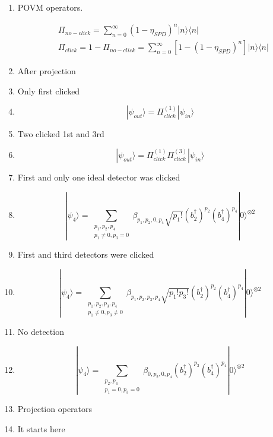 \documentclass[12pt]{article}
\begin{document}
\begin{enumerate}
\item POVM operators.

\begin{align*}
&  \Pi_{no-click} = \sum_{n=0}^{\infty} (1-\eta_{SPD})^n  |n\rangle  \langle n|   \\
&  \Pi_{click} = 1 - \Pi_{no-click} = \sum_{n=0}^{\infty}[1 - (1-\eta_{SPD})^n]  |n\rangle  \langle n|
\end{align*}




\item After projection

\item Only first clicked
\item $$ |\psi_{out}\rangle = \Pi_{click}^{(1)} |\psi_{in}\rangle $$

\item Two clicked 1st and 3rd
\item $$ |\psi_{out}\rangle = \Pi_{click}^{(1)}\Pi_{click}^{(3)}  |\psi_{in}\rangle $$



\item First and only one ideal detector was clicked

\item $$ |\psi_4\rangle = \sum_{\substack{p_{1},p_{2},p_{4} \\ p_{1} \neq 0, p_{3}=0}} \beta_{p_{1},p_{2},0,p_{4}} \sqrt{p_{1}!} (b_{2}^{\dag})^{p_{2}} (b_{4}^{\dag})^{p_{4}}  |0\rangle^{\otimes 2} $$

\item First and third detectors were clicked

\item $$ |\psi_4\rangle = \sum_{\substack{p_{1},p_{2},p_{3},p_{4} \\ p_{1} \neq 0, p_{3} \neq 0}} \beta_{p_{1},p_{2},p_{3},p_{4}} \sqrt{p_{1}!p_{3}!} (b_{2}^{\dag})^{p_{2}} (b_{4}^{\dag})^{p_{4}} |0\rangle^{\otimes 2} $$

\item No detection

\item $$ |\psi_4\rangle = \sum_{\substack{p_{2},p_{4} \\ p_{1}=0, p_{3}=0}} \beta_{0,p_{2},0,p_{4}} (b_{2}^{\dag})^{p_{2}} (b_{4}^{\dag})^{p_{4}} |0\rangle^{\otimes 2} $$

\item Projection operators




\item It starts here 



\end{enumerate}
\end{document}
